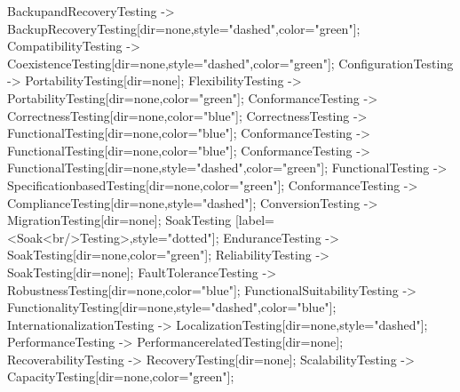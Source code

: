 \documentclass{article}
\begin{document}
{BackupandRecoveryTesting -> BackupRecoveryTesting[dir=none,style="dashed",color="green"];
CompatibilityTesting -> CoexistenceTesting[dir=none,style="dashed",color="green"];
ConfigurationTesting -> PortabilityTesting[dir=none];
FlexibilityTesting -> PortabilityTesting[dir=none,color="green"];
ConformanceTesting -> CorrectnessTesting[dir=none,color="blue"];
CorrectnessTesting -> FunctionalTesting[dir=none,color="blue"];
ConformanceTesting -> FunctionalTesting[dir=none,color="blue"];
ConformanceTesting -> FunctionalTesting[dir=none,style="dashed",color="green"];
FunctionalTesting -> SpecificationbasedTesting[dir=none,color="green"];
ConformanceTesting -> ComplianceTesting[dir=none,style="dashed"];
ConversionTesting -> MigrationTesting[dir=none];
SoakTesting [label=<Soak<br/>Testing>,style="dotted"];
EnduranceTesting -> SoakTesting[dir=none,color="green"];
ReliabilityTesting -> SoakTesting[dir=none];
FaultToleranceTesting -> RobustnessTesting[dir=none,color="blue"];
FunctionalSuitabilityTesting -> FunctionalityTesting[dir=none,style="dashed",color="blue"];
InternationalizationTesting -> LocalizationTesting[dir=none,style="dashed"];
PerformanceTesting -> PerformancerelatedTesting[dir=none];
RecoverabilityTesting -> RecoveryTesting[dir=none];
ScalabilityTesting -> CapacityTesting[dir=none,color="green"];

}
\end{document}
